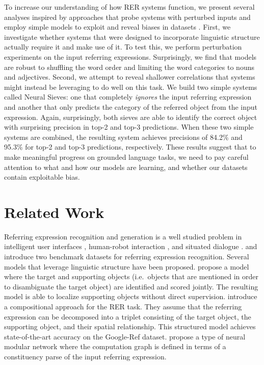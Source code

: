 \documentclass[11pt,a4paper]{article}
\begin{document}
To increase our understanding of how RER systems function, we present several analyses inspired by approaches that probe systems with perturbed inputs \cite{jia2017adversarial} and employ simple models to exploit and reveal biases in datasets \cite{chen2016thorough}.
First, we investigate whether systems that were designed to incorporate linguistic structure actually require it and make use of it.
To test this, we perform perturbation experiments on the input referring expressions.
Surprisingly, we find that models are robust to shuffling the word order and limiting the word categories to nouns and adjectives.
Second, we attempt to reveal shallower correlations that systems might instead be leveraging to do well on this task. We build two simple systems called Neural Sieves: one that completely \textit{ignores} the input referring expression and another that only predicts the category of the referred object from the input expression.
Again, surprisingly, both sieves are able to identify the correct object with surprising precision in top-2 and top-3 predictions.
When these two simple systems are combined, the resulting system achieves precisions of 84.2\% and 95.3\% for top-2 and top-3 predictions, respectively.
These results suggest that to make meaningful progress on grounded language tasks, we need to pay careful attention to what and how our models are learning, and whether our datasets contain exploitable bias.
%
\vspace{-5pt}
\section{Related Work}\label{sec:related}
\vspace{-5pt}
Referring expression recognition and generation is a well studied problem in intelligent user interfaces \cite{chai2004probabilistic}, human-robot interaction \cite{fang2012integrating,chai2014collaborative, williams2016situated}, and situated dialogue \cite{kennington2017simple}.
\citet{KazemzadehOrdonezMattenBergEMNLP14} and \citet{mao2016generation} introduce two benchmark datasets for referring expression recognition.
Several models that leverage linguistic structure have been proposed. \citet{nagaraja16refexp} propose a model where the target and supporting objects (i.e.~objects that are mentioned in order to disambiguate the target object) are identified and scored jointly. The resulting model is able to localize supporting objects without direct supervision.
\citet{hu2017modeling} introduce a compositional approach for the RER task. They assume that the referring expression can be decomposed into a triplet consisting of the target object, the supporting object, and their spatial relationship. This structured model achieves state-of-the-art accuracy on the Google-Ref dataset. \citet{cirik2018using} propose a type of neural modular network \cite{andreas2016neural} where the computation graph is defined in terms of a constituency parse of the input referring expression. 
\end{document}
